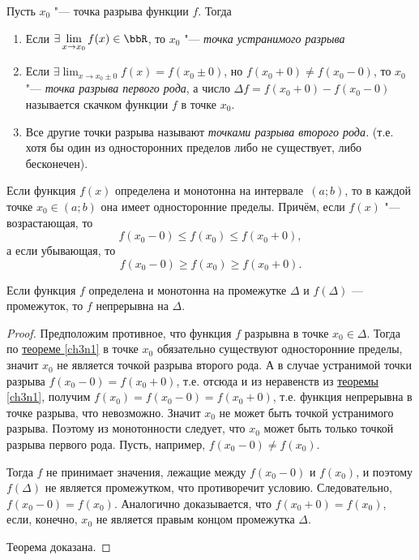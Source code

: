 \begin{defn}
Пусть $x_0$ "--- точка разрыва функции $f$. Тогда 
\begin{enumerate}[wide, labelwidth=!, labelindent=0pt]
\item

Если $\exists \lim_{x \to x_0}\limits f(x) \in \bbR$, то $x_0$ "--- \textit{точка устранимого разрыва}
\item
Если $\exists \lim_{x \to x_0\pm0}\limits f(x)=f(x_0\pm 0)$, но $f(x_0+0)\ne f(x_0-0)$, то $x_0$ "--- \textit{точка разрыва первого рода}, а число $\Delta f=f(x_0+0)-f(x_0-0)$ называется скачком функции $f$ в точке $x_0$.
\item
Все другие точки разрыва называют \textit{точками разрыва второго рода.} (т.е. хотя бы один из односторонних пределов либо не существует, либо бесконечен).
\end{enumerate}
\end{defn}
\begin{thm} \label{ch3n1} 
Если функция $f(x)$ определена и монотонна на интервале~$(a;b)$, то в каждой точке $x_0\in(a;b)$ она имеет односторонние пределы. Причём, если $f(x)$ "--- возрастающая, то 
$$
f(x_0-0)\le f(x_0)\le f(x_0+0),
$$
а если убывающая, то
$$
f(x_0-0)\ge f(x_0)\ge f(x_0+0).
$$
\end{thm}
\begin{thm} \label{ch3n3} 
Если функция $f$ определена и монотонна на промежутке $\Delta$ и $f(\Delta)$ — промежуток, то $f$ непрерывна на $\Delta$.
\end{thm}
\begin{proof}
Предположим противное, что функция $f$ разрывна в точке $x_0 \in\Delta$. Тогда по \hyperref[ch3n1]{теореме \ref{ch3n1}} в точке $x_0$ обязательно существуют односторонние пределы, значит $x_0$ не является точкой разрыва второго рода.  А в случае устранимой точки разрыва $f(x_0-0)=f(x_0+0)$, т.е. отсюда и из неравенств из   \hyperref[ch3n1]{теоремы \ref{ch3n1}}, получим $f(x_0)=f(x_0-0)=f(x_0+0)$, т.е. функция непрерывна в точке разрыва, что невозможно. Значит $x_0$ не может быть точкой устранимого разрыва. Поэтому из монотонности следует, что $x_0$ может быть только точкой разрыва первого рода. Пусть, например, $f(x_0-0)\ne f(x_0)$.

Тогда $f$ не принимает значения, лежащие между $f(x_0 - 0)$ и $f(x_0)$, и поэтому $f(\Delta)$ не является промежутком, что противоречит условию. Следовательно, $f(x_0-0) = f(x_0)$. Аналогично доказывается, что  $f(x_0 + 0) = f(x_0)$, если, конечно, $x_0$ не является правым концом промежутка $\Delta$. 

Теорема доказана.
\end{proof} 
